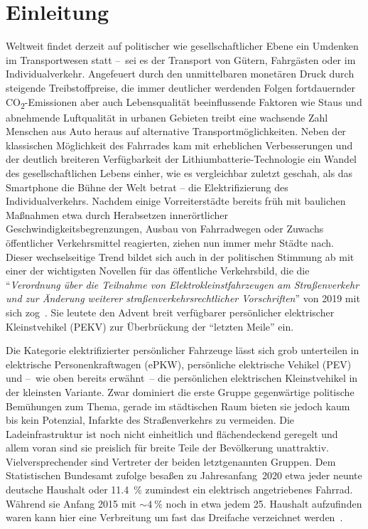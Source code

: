 \chapter{Einleitung}
	Weltweit findet derzeit auf politischer wie gesellschaftlicher Ebene ein Umdenken im Transportwesen statt --~sei es der Transport von Gütern, Fahrgästen oder im Individualverkehr.
	Angefeuert durch den unmittelbaren monetären Druck durch steigende Treibstoffpreise, die immer deutlicher werdenden Folgen fortdauernder CO\textsubscript{2}-Emissionen aber auch Lebensqualität beeinflussende Faktoren wie Staus und abnehmende Luftqualität in urbanen Gebieten treibt eine wachsende Zahl Menschen aus Auto heraus auf alternative Transportmöglichkeiten.
	Neben der klassischen Möglichkeit des Fahrrades kam mit erheblichen Verbesserungen und der deutlich breiteren Verfügbarkeit der Lithiumbatterie-Technologie ein Wandel des gesellschaftlichen Lebens einher, wie es vergleichbar zuletzt geschah, als das Smartphone die Bühne der Welt betrat -- die Elektrifizierung des Individualverkehrs.
	Nachdem einige Vorreiterstädte bereits früh mit baulichen Maßnahmen etwa durch Herabsetzen innerörtlicher Geschwindigkeitsbegrenzungen, Ausbau von Fahrradwegen oder Zuwachs öffentlicher Verkehrsmittel reagierten, ziehen nun immer mehr Städte nach.
	Dieser wechselseitige Trend bildet sich auch in der politischen Stimmung ab mit einer der wichtigsten Novellen für das öffentliche Verkehrsbild, die die ``\textit{Verordnung über die Teilnahme von Elektrokleinstfahrzeugen am Straßenverkehr und zur Änderung weiterer straßenverkehrsrechtlicher Vorschriften}'' von 2019 mit sich zog~\cite{Bundesgesetzblatt.2019}.
	Sie leutete den Advent breit verfügbarer persönlicher elektrischer Kleinstvehikel (PEKV) zur Überbrückung der ``letzten Meile'' ein.\par\medskip
	Die Kategorie elektrifizierter persönlicher Fahrzeuge lässt sich grob unterteilen in elektrische Personenkraftwagen (ePKW), persönliche elektrische Vehikel (PEV) und --~wie oben bereits erwähnt~-- die persönlichen elektrischen Kleinstvehikel in der kleinsten Variante.
	Zwar dominiert die erste Gruppe gegenwärtige politische Bemühungen zum Thema, gerade im städtischen Raum bieten sie jedoch kaum bis kein Potenzial, Infarkte des Straßenverkehrs zu vermeiden.
	Die Ladeinfrastruktur ist noch nicht einheitlich und flächendeckend geregelt und allem voran sind sie preislich für breite Teile der Bevölkerung unattraktiv.
	Vielversprechender sind Vertreter der beiden letztgenannten Gruppen.
	Dem Statistischen Bundesamt zufolge besaßen zu Jahresanfang~2020 etwa jeder neunte deutsche Haushalt oder \SI{11,4}{\percent} zumindest ein elektrisch angetriebenes Fahrrad.
	Während sie Anfang 2015 mit \(\sim \SI{4}{\percent}\) noch in etwa jedem 25. Haushalt aufzufinden waren kann hier eine Verbreitung um fast das Dreifache verzeichnet werden~\cite{zahl.der.ebikes.StatistischesBundesamt.2020.09.28}.\par\medskip